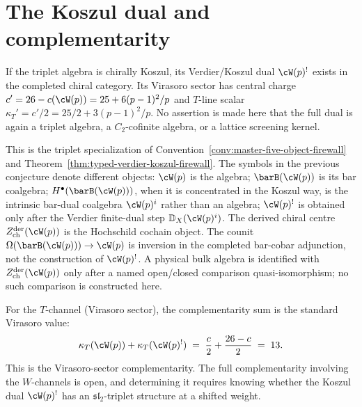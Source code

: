 
\section{The Koszul dual and complementarity}
\label{sec:wp-koszul-dual}

\begin{conjecture}\label{conj:wp-koszul-dual}
If the triplet algebra is chirally Koszul, its Verdier/Koszul
dual $\cW(p)^!$ exists in the completed chiral category. Its
Virasoro sector has central charge
$c' = 26 - c(\cW(p)) = 25 + 6(p-1)^2/p$ and
$T$-line scalar
$\kappa_T' = c'/2 = 25/2 + 3(p-1)^2/p$.
No assertion is made here that the full dual is again a triplet
algebra, a $C_2$-cofinite algebra, or a lattice screening kernel.
\end{conjecture}

\begin{remark}
\label{rem:wp-five-object-firewall}
This is the triplet specialization of
Convention~\ref{conv:master-five-object-firewall} and
Theorem~\ref{thm:typed-verdier-koszul-firewall}. The symbols in the
previous conjecture denote different objects:
$\cW(p)$ is the algebra; $\barB(\cW(p))$ is its bar coalgebra;
$H^\bullet(\barB(\cW(p)))$, when it is concentrated in the Koszul
way, is the intrinsic bar-dual coalgebra $\cW(p)^i$ rather than an
algebra; $\cW(p)^!$ is obtained only after the Verdier finite-dual
step $\mathbb D_X(\cW(p)^i)$. The derived chiral centre
$Z^{\mathrm{der}}_{\mathrm{ch}}(\cW(p))$ is the Hochschild cochain
object. The counit
$\Omega(\barB(\cW(p)))\to\cW(p)$ is inversion in the completed
bar-cobar adjunction, not the construction of $\cW(p)^!$.
A physical bulk algebra is identified with
$Z^{\mathrm{der}}_{\mathrm{ch}}(\cW(p))$ only after a named
open/closed comparison quasi-isomorphism; no such comparison is
constructed here.
\end{remark}

\begin{remark}
\label{rem:wp-complementarity}
For the $T$-channel (Virasoro sector), the complementarity
sum is the standard Virasoro value:
\begin{equation}\label{eq:wp-complementarity}
 \kappa_T(\cW(p)) + \kappa_T(\cW(p)^!)
 \;=\; \frac{c}{2} + \frac{26 - c}{2}
 \;=\; 13.
\end{equation}
This is the Virasoro-sector complementarity. The full
complementarity involving the $W$-channels is open, and
determining it requires knowing whether the Koszul dual
$\cW(p)^!$ has an $\mathfrak{sl}_2$-triplet structure at a
shifted weight.
\end{remark}

